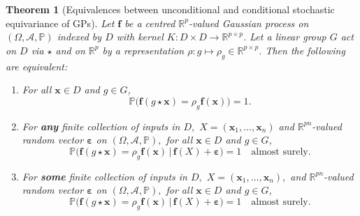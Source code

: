 \documentclass[10pt,a4paper]{amsart}
\newtheorem{thm}{Theorem}
\newcommand{\R}{\mathbb{R}}
\newcommand{\bff}{\boldsymbol{f}}
\newcommand{\bx}{\boldsymbol{x}}
\begin{document}
\begin{thm}[Equivalences between unconditional and conditional stochastic equivariance of GPs]\label{thm:equivariant-conditioning}
Let $\bff$ be a centred $\mathbb{R}^{p}$-valued Gaussian process on $(\Omega, \mathcal{A}, \mathbb{P})$ indexed by $D$ with kernel $K \colon D \times D \to \R^{p \times p}$. Let a linear group $G$ act on $D$ via $\star$ and on $\R^{p}$ by a representation $\rho \colon g \mapsto \rho_{g} \in \R^{p \times p}$.
Then the following are equivalent:
\begin{enumerate}[label=(\roman*)]
    \item For all
    $\bx \in D$ and $g \in G$,
    \begin{equation*}\mathbb{P}\big(\bff(g \star \bx) = \rho_{g} \bff(\bx)\big) = 1.\end{equation*}
    \item For \textbf{any} finite collection of inputs in $D,$ $X = \left(\bx_{1},\dots,\bx_{n}\right)$ and $\R^{pn}$-valued random vector $\boldsymbol{\varepsilon}$ on $(\Omega, \mathcal{A}, \mathbb{P}),$ for all $\bx \in D$ and $g \in G$,
    \begin{equation*}\mathbb{P}\big(\bff(g \star \bx) = \rho_{g} \bff(\bx) \,\big|\, \bff(X)+\boldsymbol{\varepsilon}\big)= 1 \quad \text{almost surely.}\end{equation*}
    \item For \textbf{some} finite collection of inputs in $D,$ $X = \left(\bx_{1},\dots,\bx_{n}\right),$ and $\R^{pn}$-valued random vector $\boldsymbol{\varepsilon}$ on $(\Omega, \mathcal{A}, \mathbb{P}),$ for all $\bx \in D$ and $g \in G$,
    \begin{equation*}\mathbb{P}\big(\bff(g \star \bx) = \rho_{g} \bff(\bx) \,\big|\, \bff(X)+\boldsymbol{\varepsilon}\big)= 1 \quad \text{almost surely.}\end{equation*}
\end{enumerate}
\end{thm}
\end{document}
